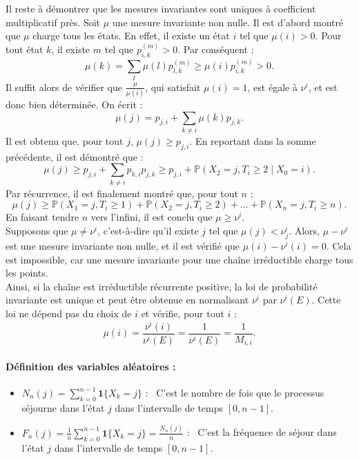 \begin{sloppypar}
Il reste à démontrer que les mesures invariantes sont uniques à coefficient multiplicatif près. Soit $\mu$ une mesure invariante non nulle. Il est d'abord montré que $\mu$ charge tous les états. En effet, il existe un état $i$ tel que $\mu(i) > 0$. Pour tout état $k$, il existe $m$ tel que $p^{(m)}_{i,k} > 0$. Par conséquent :
\[
\mu(k) = \sum_l \mu(l) p^{(m)}_{l,k} \geq \mu(i) p^{(m)}_{i,k} > 0.
\]
Il suffit alors de vérifier que $\frac{\mu}{\mu(i)}$, qui satisfait $\mu(i) = 1$, est égale à $\nu^i$, et est donc bien déterminée. On écrit :
\[
\mu(j) = p_{j,i} + \sum_{k \neq i} \mu(k) p_{j,k}.
\]
Il est obtenu que, pour tout $j$, $\mu(j) \geq p_{j,i}$. En reportant dans la somme précédente, il est démontré que :
\[
\mu(j) \geq p_{j,i} + \sum_{k \neq i} p_{k,i} p_{j,k} \geq p_{j,i} + \mathbb{P}(X_2 = j, T_i \geq 2 \mid X_0 = i).
\]
Par récurrence, il est finalement montré que, pour tout $n$ :
\[
\mu(j) \geq \mathbb{P}(X_1 = j, T_i \geq 1) + \mathbb{P}(X_2 = j, T_i \geq 2) + \dots + \mathbb{P}(X_n = j, T_i \geq n).
\]
En faisant tendre $n$ vers l’infini, il est conclu que $\mu \geq \nu^i$.\\

Supposons que $\mu \neq \nu^i$, c’est-à-dire qu’il existe $j$ tel que $\mu(j) < \nu^i_j$. Alors, $\mu - \nu^i$ est une mesure invariante non nulle, et il est vérifié que $\mu(i) - \nu^i(i) = 0$. Cela est impossible, car une mesure invariante pour une chaîne irréductible charge tous les points.\\

Ainsi, si la chaîne est irréductible récurrente positive, la loi de probabilité invariante est unique et peut être obtenue en normalisant $\nu^i$ par $\nu^i(E)$. Cette loi ne dépend pas du choix de $i$ et vérifie, pour tout $i$ :
\[
\mu(i) = \frac{\nu^i(i)}{\nu^i(E)} = \frac{1}{\nu^i(E)} = \frac{1}{M_{i,i}}.
\]

\paragraph{Définition des variables aléatoires :}
\begin{itemize}
    \item $N_n(j) = \displaystyle{\sum_{k=0}^{n-1} \mathbf{1}\{X_k = j\}}$ : \
    C'est le nombre de fois que le processus séjourne dans l'état $j$ dans l'intervalle de temps $[0, n-1]$.
    \item $F_n(j) = \displaystyle{\frac{1}{n} \sum_{k=0}^{n-1} \mathbf{1}\{X_k = j\} = \frac{N_n(j)}{n}}$ : \
    C'est la fréquence de séjour dans l'état $j$ dans l'intervalle de temps $[0, n-1]$.
\end{itemize}


\end{sloppypar}
